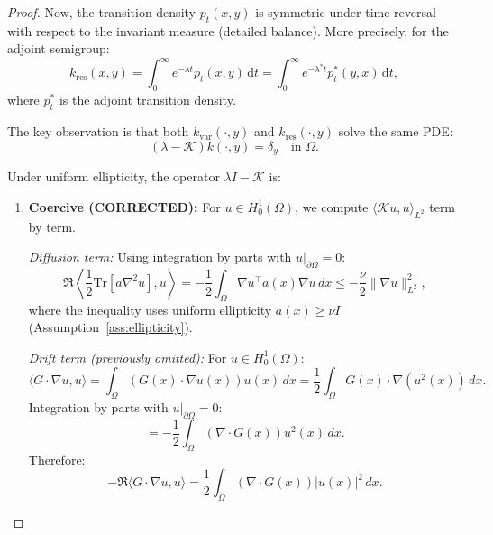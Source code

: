 \documentclass[11pt,a4paper]{article}
\newcommand{\Tr}{\mathrm{Tr}}
\newcommand{\dt}{\,\mathrm{d}t}
\newcommand{\Koop}{\mathcal{K}}
\begin{document}
\begin{proof}
Now, the transition density $p_t(x,y)$ is symmetric under time reversal with respect to the invariant measure (detailed balance). More precisely, for the adjoint semigroup:
\begin{equation}
k_{\mathrm{res}}(x,y) = \int_0^\infty e^{-\lambda t} p_t(x,y) \dt = \int_0^\infty e^{-\lambda^* t} p_t^*(y,x) \dt,
\end{equation}
where $p_t^*$ is the adjoint transition density.

The key observation is that both $k_{\mathrm{var}}(\cdot, y)$ and $k_{\mathrm{res}}(\cdot, y)$ solve the same PDE:
\begin{equation}
(\lambda - \Koop) k(\cdot, y) = \delta_y \quad \text{in } \Omega.
\end{equation}

Under uniform ellipticity, the operator $\lambda I - \Koop$ is:
\begin{enumerate}
\item \textbf{Coercive (CORRECTED):} For $u \in H^1_0(\Omega)$, we compute $\langle \Koop u, u \rangle_{L^2}$ term by term.

\textit{Diffusion term:} Using integration by parts with $u|_{\partial\Omega} = 0$:
\begin{equation}
\Re\left\langle \frac{1}{2}\Tr[a\nabla^2 u], u \right\rangle = -\frac{1}{2} \int_\Omega \nabla u^\top a(x) \nabla u \, dx \leq -\frac{\nu}{2}\|\nabla u\|_{L^2}^2,
\end{equation}
where the inequality uses uniform ellipticity $a(x) \geq \nu I$ (Assumption~\ref{ass:ellipticity}).

\textit{Drift term (previously omitted):} For $u \in H^1_0(\Omega)$:
\begin{equation}
\langle G \cdot \nabla u, u \rangle = \int_\Omega (G(x) \cdot \nabla u(x)) u(x) \, dx = \frac{1}{2} \int_\Omega G(x) \cdot \nabla(u^2(x)) \, dx.
\end{equation}
Integration by parts with $u|_{\partial\Omega} = 0$:
\begin{equation}
= -\frac{1}{2} \int_\Omega (\nabla \cdot G(x)) u^2(x) \, dx.
\end{equation}
Therefore:
\begin{equation}
-\Re\langle G \cdot \nabla u, u \rangle = \frac{1}{2} \int_\Omega (\nabla \cdot G(x)) |u(x)|^2 \, dx.
\end{equation}


\end{enumerate}
\end{proof}
\end{document}
